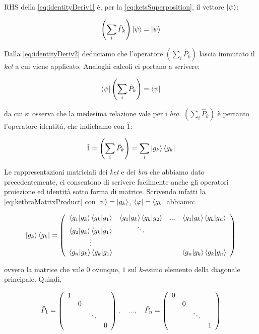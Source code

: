 RHS della \eqref{eq:identityDeriv1} è, per la \eqref{eq:ketsSuperposition}, il vettore $\ket{\psi}$:

	\begin{equation} \label{eq:identityDeriv2}
		\left ( \sum_i \hat{P}_k \right ) \ket{\psi} = \ket{\psi}
	\end{equation}

Dalla \eqref{eq:identityDeriv2} deduciamo che l'operatore $\left ( \sum_i \hat{P}_k \right )$ lascia immutato il \textit{ket} a cui viene applicato. Analoghi calcoli ci portano a scrivere:

	\begin{equation}
		\bra{\psi} \left ( \sum_i \hat{P}_k \right ) = \bra{\psi}
	\end{equation}

da cui si osserva che la medesima relazione vale per i \textit{bra}. $\left ( \sum_i \hat{P}_k \right )$ è pertanto l'operatore identità, che indichamo con $\hat{1}$:

	\[
		\hat{1} =  \left ( \sum_i \hat{P}_k \right ) = \sum_i \ket{g_k} \bra{g_k}
	\]

Le rappresentazioni matriciali dei \textit{ket} e dei \textit{bra} che abbiamo dato precedentemente, ci consentono di scrivere facilmente anche gli operatori proiezione ed identità sotto forma di matrice. Scrivendo infatti la \eqref{eq:ketbraMatrixProduct} con $\ket{\psi} = \ket{g_k}$, $\bra{\varphi} = \bra{g_k}$ abbiamo:

	\begin{equation}
		\ket{g_k}\bra{g_k} = 
		\left ( \begin{array}{c c c c}
			\braket{g_1}{g_k} \braket{g_k}{g_1} & \braket{g_1}{g_k}\braket{g_k}{g_2} & ... & \braket{g_1}{g_k} \braket{g_k}{g_n} \\
			\braket{g_2}{g_k} \braket{g_k}{g_1} & \ddots &  & \\
			\vdots & & & \\
			\braket{g_n}{g_k} \braket{g_k}{g_1}& & & \braket{g_n}{g_k} \braket{g_k}{g_n}
		\end{array} \right )
	\end{equation}

ovvero la matrice che vale $0$ ovunque, $1$ sul $k$-esimo elemento della diagonale principale. Quindi,

	\begin{equation}
		\hat{P}_1 = 
		\left ( \begin{array}{c c c c}
			1 & & & \\
			& 0 & & \\
			& & \ddots & \\
			& & & 0 \\
		\end{array} \right ), \quad ..., \quad
		\hat{P}_n = 
		\left ( \begin{array}{c c c c}
			0 & & & \\
			& 0 & & \\
			& & \ddots & \\
			& & & 1 \\
		\end{array} \right )
	\end{equation}

